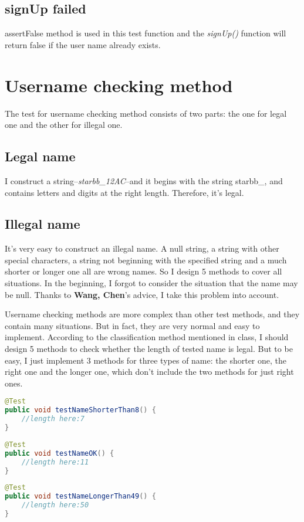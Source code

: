 \documentclass[a4paper]{report}
\begin{document}
\subsection{signUp failed}
\par assertFalse method is used in this test function and the \emph{signUp()} function will return false if the user name already exists.

\section{Username checking method}
\par The test for username checking method consists of two parts: the one for legal one and the other for illegal one.
\subsection{Legal name}
\par I construct a string--\emph{starbb\_12AC}--and it begins with the string starbb\_, and contains letters and digits at the right length. Therefore, it's legal.
\subsection{Illegal name}
\par It's very easy to construct an illegal name. A null string, a string with other special characters, a string not beginning with the specified string and a much shorter or longer one all are wrong names. So I design 5 methods to cover all situations. In the beginning, I forgot to consider the situation that the name may be null. Thanks to \textbf{Wang, Chen}'s advice, I take this problem into account.
\par Username checking methods are more complex than other test methods, and they contain many situations. But in fact, they are very normal and easy to implement. According to the classification method mentioned in class, I should design 5 methods to check whether the length of tested name is legal. But to be easy, I just implement 3 methods for three types of name: the shorter one, the right one and the longer one, which don't include the two methods for just right ones.
\begin{lstlisting}[language=java]
@Test
public void testNameShorterThan8() {
    //length here:7
}
\end{lstlisting}
\begin{lstlisting}[language=java]
@Test
public void testNameOK() {
    //length here:11
}
\end{lstlisting}
\begin{lstlisting}[language=java]
@Test
public void testNameLongerThan49() {
    //length here:50
}
\end{lstlisting}
\end{document}
